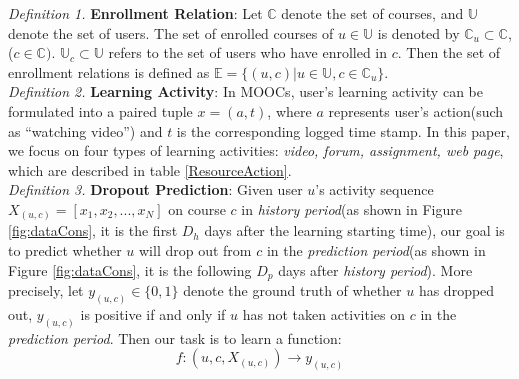 	\emph{Definition 1.} \textbf{Enrollment Relation}: Let $\mathbb{C}$ denote the set of courses, and $\mathbb{U}$ denote the set of users. 
	The set of enrolled courses of $u\in \mathbb{U}$ is denoted by $\mathbb{C}_u\subset \mathbb{C}$, ($c\in\mathbb{C})$.  $\mathbb{U}_c\subset \mathbb{U}$ refers to the set of users who have enrolled in $c$. Then the set of enrollment relations is defined as $\mathbb{E}=\{(u,c)|u\in \mathbb{U}, c\in \mathbb{C}_u\}$.\\
	
    
	\emph{Definition 2.} \textbf{Learning Activity}: 
	In MOOCs, user's learning activity can be formulated into a paired tuple  $x = (a, t)$, where $a$ represents user's action(such as ``watching video'') and $t$ is the corresponding logged time stamp. In this paper, we focus on four types of learning activities: \emph{video, forum, assignment, web page}, which are described in table \ref{ResourceAction}. \\
	
    
	
	
    \emph{Definition 3.} \textbf{Dropout Prediction}: Given user $u$'s activity sequence $X_{(u,c)}= [x_1, x_2,...,x_N]$ on course $c$ in \textit{history period}(as shown in Figure \ref{fig:dataCons}, it is the first $D_h$ days after the learning starting time), our goal is to predict whether $u$ will drop out from $c$ in the \textit{prediction period}(as shown in Figure \ref{fig:dataCons}, it is the following $D_p$ days after \textit{history period}). More precisely, let $y_{(u,c)} \in \{0,1\}$ denote the ground truth of whether $u$ has dropped out, $y_{(u,c)}$ is positive if and only if $u$ has not taken activities on $c$ in the \textit{prediction period}. Then our task is to learn a function:
	 $$f: (u,c,X_{(u,c)})\to y_{(u,c)}$$
     
